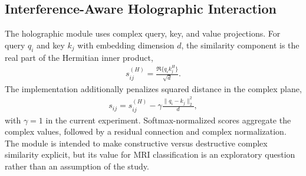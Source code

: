 \documentclass[journal]{IEEEtran}
\begin{document}
\subsection{Interference-Aware Holographic Interaction}
The holographic module uses complex query, key, and value projections. For query $q_i$ and key $k_j$ with embedding dimension $d$, the similarity component is the real part of the Hermitian inner product,
\begin{align}
s_{ij}^{(H)}
= \frac{\Re\{q_i k_j^H\}}{\sqrt{d}}.
\end{align}
The implementation additionally penalizes squared distance in the complex plane,
\begin{align}
s_{ij}=s_{ij}^{(H)}
-\gamma\frac{\|q_i-k_j\|_2^2}{d},
\label{eq:holo}
\end{align}
with $\gamma=1$ in the current experiment. Softmax-normalized scores aggregate the complex values, followed by a residual connection and complex normalization. The module is intended to make constructive versus destructive complex similarity explicit, but its value for MRI classification is an exploratory question rather than an assumption of the study.
\end{document}
